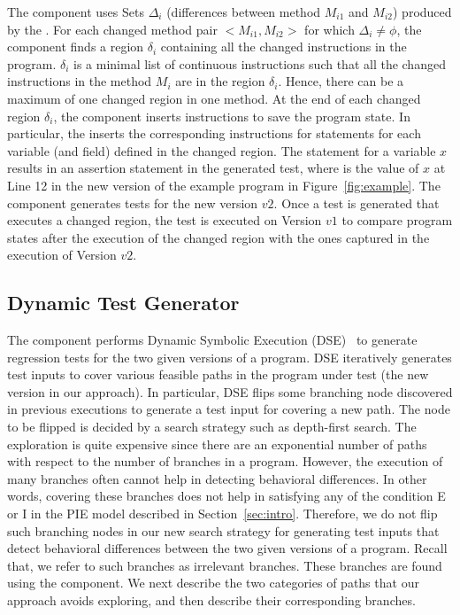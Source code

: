The  component uses Sets $\Delta_i$ (differences between method $M_{i1}$ and $M_{i2}$) produced by the . For each changed method pair $<M_{i1}, M_{i2}>$ for which $\Delta_i \neq \phi$, the  component finds a region $\delta_i$ containing all the changed instructions in the program. $\delta_i$ is a minimal list of continuous instructions such that all the changed instructions in the method $M_i$ are in the region $\delta_i$. Hence, there can be a maximum of one changed region in one method. At the end of each changed region $\delta_i$, the  component inserts instructions to save the program state. In particular, the  inserts the corresponding instructions for  statements for each variable (and field) defined in the changed region.
The  statement for a variable $x$ results in an assertion statement  in the generated test, where  is the value of $x$ at Line 12 in the new version of the example program in Figure~\ref{fig:example}.
The  component generates tests for the new version $v2$.
Once a test is generated that executes a changed region, 
the test is executed on Version $v1$ 
to compare program states after the execution of the changed region
with the ones captured in the execution of Version $v2$.



\subsection{Dynamic Test Generator}

The  component performs Dynamic Symbolic Execution (DSE)~\cite{Clarke:symbolic, king:symex, dart, cute, exe} to 
generate regression tests for the two given versions of a program. DSE iteratively generates test inputs to cover various feasible paths in the program under test (the new version in our approach). In particular, DSE flips some branching node discovered in previous executions to generate a test input for covering a new path. The node to be flipped is decided by a search strategy such as depth-first search. 
The exploration is quite expensive since there are an exponential 
number of paths with respect to the number of branches in a program.
 However, the execution of many branches often cannot help in detecting behavioral differences. 
 In other words, covering these branches does not help in satisfying any of the condition E or I in the PIE model described in Section~\ref{sec:intro}. 
 Therefore, we do not flip such branching nodes in our new search strategy for generating test inputs that detect 
 behavioral differences between the two given versions of a program. Recall that, we refer to such branches as irrelevant branches. These branches are found using the   component.
 We next describe the two categories of paths that our approach avoids exploring, and then describe their corresponding branches.
 
